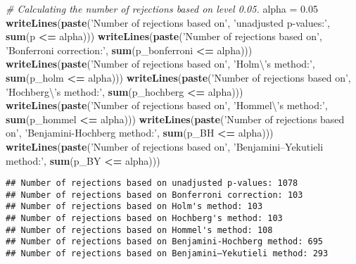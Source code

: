 \documentclass[
]{book}
\newenvironment{Shaded}{\begin{snugshade}}{\end{snugshade}}
\newcommand{\CharTok}[1]{\textcolor[rgb]{0.31,0.60,0.02}{#1}}
\newcommand{\CommentTok}[1]{\textcolor[rgb]{0.56,0.35,0.01}{\textit{#1}}}
\newcommand{\FloatTok}[1]{\textcolor[rgb]{0.00,0.00,0.81}{#1}}
\newcommand{\KeywordTok}[1]{\textcolor[rgb]{0.13,0.29,0.53}{\textbf{#1}}}
\newcommand{\NormalTok}[1]{#1}
\newcommand{\OperatorTok}[1]{\textcolor[rgb]{0.81,0.36,0.00}{\textbf{#1}}}
\newcommand{\StringTok}[1]{\textcolor[rgb]{0.31,0.60,0.02}{#1}}
\begin{document}
\begin{Shaded}
\begin{Highlighting}[]
\CommentTok{# Calculating the number of rejections based on level 0.05.}
\NormalTok{alpha =}\StringTok{ }\FloatTok{0.05}
\KeywordTok{writeLines}\NormalTok{(}\KeywordTok{paste}\NormalTok{(}\StringTok{'Number of rejections based on'}\NormalTok{,}
                 \StringTok{'unadjusted p-values:'}\NormalTok{, }\KeywordTok{sum}\NormalTok{(p }\OperatorTok{<=}\StringTok{ }\NormalTok{alpha)))}
\KeywordTok{writeLines}\NormalTok{(}\KeywordTok{paste}\NormalTok{(}\StringTok{'Number of rejections based on'}\NormalTok{,}
                 \StringTok{'Bonferroni correction:'}\NormalTok{,}
                 \KeywordTok{sum}\NormalTok{(p_bonferroni }\OperatorTok{<=}\StringTok{ }\NormalTok{alpha)))}
\KeywordTok{writeLines}\NormalTok{(}\KeywordTok{paste}\NormalTok{(}\StringTok{'Number of rejections based on'}\NormalTok{,}
                 \StringTok{'Holm}\CharTok{\textbackslash{}'}\StringTok{s method:'}\NormalTok{,}
                 \KeywordTok{sum}\NormalTok{(p_holm }\OperatorTok{<=}\StringTok{ }\NormalTok{alpha)))}
\KeywordTok{writeLines}\NormalTok{(}\KeywordTok{paste}\NormalTok{(}\StringTok{'Number of rejections based on'}\NormalTok{,}
                 \StringTok{'Hochberg}\CharTok{\textbackslash{}'}\StringTok{s method:'}\NormalTok{,}
                 \KeywordTok{sum}\NormalTok{(p_hochberg }\OperatorTok{<=}\StringTok{ }\NormalTok{alpha)))}
\KeywordTok{writeLines}\NormalTok{(}\KeywordTok{paste}\NormalTok{(}\StringTok{'Number of rejections based on'}\NormalTok{,}
                 \StringTok{'Hommel}\CharTok{\textbackslash{}'}\StringTok{s method:'}\NormalTok{,}
                 \KeywordTok{sum}\NormalTok{(p_hommel }\OperatorTok{<=}\StringTok{ }\NormalTok{alpha)))}
\KeywordTok{writeLines}\NormalTok{(}\KeywordTok{paste}\NormalTok{(}\StringTok{'Number of rejections based on'}\NormalTok{,}
                 \StringTok{'Benjamini-Hochberg method:'}\NormalTok{,}
                 \KeywordTok{sum}\NormalTok{(p_BH }\OperatorTok{<=}\StringTok{ }\NormalTok{alpha)))}
\KeywordTok{writeLines}\NormalTok{(}\KeywordTok{paste}\NormalTok{(}\StringTok{'Number of rejections based on'}\NormalTok{,}
                 \StringTok{'Benjamini–Yekutieli method:'}\NormalTok{,}
                 \KeywordTok{sum}\NormalTok{(p_BY }\OperatorTok{<=}\StringTok{ }\NormalTok{alpha)))}
\end{Highlighting}
\end{Shaded}

\begin{verbatim}
## Number of rejections based on unadjusted p-values: 1078
## Number of rejections based on Bonferroni correction: 103
## Number of rejections based on Holm's method: 103
## Number of rejections based on Hochberg's method: 103
## Number of rejections based on Hommel's method: 108
## Number of rejections based on Benjamini-Hochberg method: 695
## Number of rejections based on Benjamini–Yekutieli method: 293
\end{verbatim}
\end{document}
